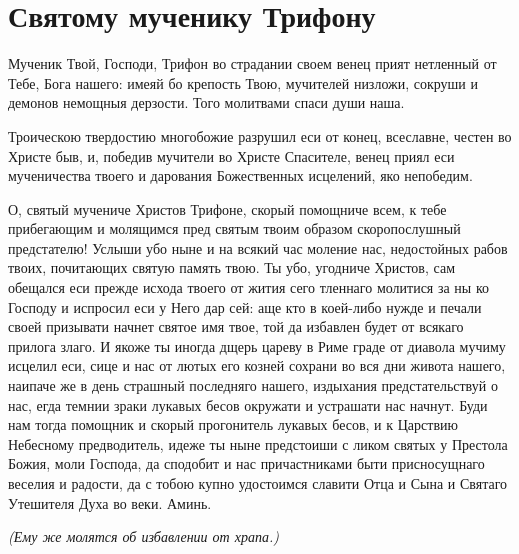 
 
\vspace{-\baselineskip}
\section{Святому мученику Трифону}
 



Мученик Твой, Господи, Трифон во страдании своем венец прият нетленный от Тебе, Бога нашего: имеяй бо крепость Твою, мучителей низложи, сокруши и демонов немощныя дерзости. Того молитвами спаси души наша.




Троическою твердостию многобожие разрушил еси от конец, всеславне, честен во Христе быв, и, победив мучители во Христе Спасителе, венец приял еси мученичества твоего и дарования Божественных исцелений, яко непобедим.




О, святый мучениче Христов Трифоне, скорый помощниче всем, к тебе прибегающим и молящимся пред святым твоим образом скоропослушный предстателю! Услыши убо ныне и на всякий час моление нас, недостойных рабов твоих, почитающих святую память твою. Ты убо, угодниче Христов, сам обещался еси прежде исхода твоего от жития сего тленнаго молитися за ны ко Господу и испросил еси у Него дар сей: аще кто в коей-либо нужде и печали своей призывати начнет святое имя твое, той да избавлен будет от всякаго прилога злаго. И якоже ты иногда дщерь цареву в Риме граде от диавола мучиму исцелил еси, сице и нас от лютых его козней сохрани во вся дни живота нашего, наипаче же в день страшный последняго нашего, издыхания предстательствуй о нас, егда темнии зраки лукавых бесов окружати и устрашати нас начнут. Буди нам тогда помощник и скорый прогонитель лукавых бесов, и к Царствию Небесному предводитель, идеже ты ныне предстоиши с ликом святых у Престола Божия, моли Господа, да сподобит и нас причастниками быти присносущнаго веселия и радости, да с тобою купно удостоимся славити Отца и Сына и Святаго Утешителя Духа во веки. Аминь.


\itshape (Ему же молятся об избавлении от храпа.)\normalfont{}
\longpage{}\mychapterending


